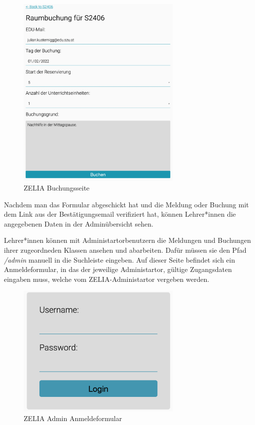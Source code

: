 \begin{figure}[H]
    \centering
    \includegraphics[width=80mm]{media/WebComponents/Buchungsseite_light.png}
    \caption{ZELIA Buchungsseite}
\end{figure}

Nachdem man das Formular abgeschickt hat und die Meldung oder Buchung mit dem Link aus der Bestätigungsemail verifiziert hat, können Lehrer*innen die angegebenen Daten in der Adminübersicht sehen.


Lehrer*innen können mit Administartorbenutzern die Meldungen und Buchungen ihrer zugeordneden Klassen ansehen und abarbeiten. Dafür müssen sie den Pfad \emph{/admin} manuell in die Suchleiste eingeben. Auf dieser Seite befindet sich ein Anmeldeformular, in das der jeweilige Administartor, gültige Zugangsdaten eingaben muss, welche vom ZELIA-Administartor vergeben werden. 

\begin{figure}[H]
    \centering
    \includegraphics[width=80mm]{media/WebComponents/Login_light.png}
    \caption{ZELIA Admin Anmeldeformular}
\end{figure}

